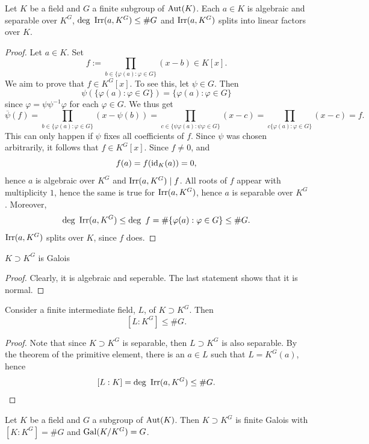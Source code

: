 \begin{lemma}
    Let $K$ be a field and $G$ a finite subgroup of $\mathrm{Aut}(K)$. Each $a\in K$ is algebraic and separable over $K^G$, $\deg\ \mathrm{Irr}(a, K^G)\leq \#G$ and $\mathrm{Irr}(a,K^G)$ splits into linear factors over $K$.  
\end{lemma}
\begin{proof}
    Let $a\in K$. Set 
    $$
        f := \prod_{b\in \{\varphi(a) : \varphi\in G\}} (x-b)\in K[x].
    $$
    We aim to prove that $f\in K^G[x]$. To see this, let $\psi\in G$.  Then 
    $$
        \psi(\{ \varphi(a) : \varphi\in G\}) = \{ \varphi(a) : \varphi\in G\} 
    $$
    since $\varphi = \psi \psi^{-1}\varphi$ for each $\varphi\in G$. We thus get 
    $$
        \overline{\psi}(f) = \prod_{b\in \{\varphi(a) : \varphi\in G\}} (x-\psi(b)) = \prod_{c\in \{\psi\varphi(a) : \psi\varphi\in G\}} (x-c) = \prod_{c\{\varphi(a) : \varphi\in G\}} (x-c) = f. 
    $$
    This can only happen if $\psi$ fixes all coefficients of $f$. Since $\psi$ was chosen arbitrarily, it follows that $f\in K^G[x]$. Since $f\neq 0$, and
    $$
        f(a) = f(\mathrm{id}_K(a)) = 0,
    $$
    hence $a$ is algebraic over $K^G$ and $\mathrm{Irr}(a,K^G)\mid f$. All roots of $f$ appear with multiplicity $1$, hence the same is true for $\mathrm{Irr}(a,K^G)$, hence $a$ is separable over $K^G$. Moreover, 
    $$
        \deg \ \mathrm{Irr}(a,K^G) \leq \deg \ f = \#\{\varphi(a) : \varphi\in G\} \leq \#G. 
    $$
    $\mathrm{Irr}(a,K^G)$ splits over $K$, since $f$ does. 
\end{proof}
\begin{corollary}
    $K\supset K^G$ is Galois
\end{corollary}
\begin{proof}
    Clearly, it is algebraic and seperable. The last statement shows that it is normal.
\end{proof}
\begin{corollary}\label{BoundedIndexOfIntermediateField}
    Consider a finite intermediate field, $L$, of $K\supset K^G$. Then 
    $$
        [L : K^G] \leq \# G.  
    $$
\end{corollary}
\begin{proof}
    Note that since $K\supset K^G$ is separable, then $L\supset K^G$ is also separable. By the theorem of the primitive element, there is an $a\in L$ such that $L= K^G(a)$, hence 
    $$
        [L:K]=\deg \ \mathrm{Irr}(a,K^G) \leq \#G.
    $$
\end{proof}
\begin{proposition}
    Let $K$ be a field and $G$ a subgroup of $\mathrm{Aut}(K)$. Then $K\supset K^G$ is finite Galois with $[K:K^G] = \#G$ and $\mathrm{Gal}(K/K^G)= G$. 
\end{proposition}
